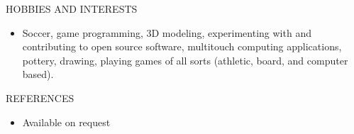 \documentclass[11pt,oneside]{article}
\newenvironment{ressection}[1]{
	\vspace{4pt}
	{\fontfamily{phv}\selectfont\Large#1}
	\begin{itemize}
	\vspace{3pt}
}{
	\end{itemize}
}
\newcommand{\resitem}[1]{
	\vspace{-4pt}
	\item \begin{flushleft} #1 \end{flushleft}
}
\begin{document}
\begin{ressection}{HOBBIES AND INTERESTS}
\resitem{Soccer, game programming, 3D modeling, experimenting with and contributing to open source software, multitouch computing applications, pottery, drawing, playing games of all sorts (athletic, board, and computer based).}
\end{ressection}

\begin{ressection}{REFERENCES}
    \resitem{Available on request}

\end{ressection}
\end{document}
